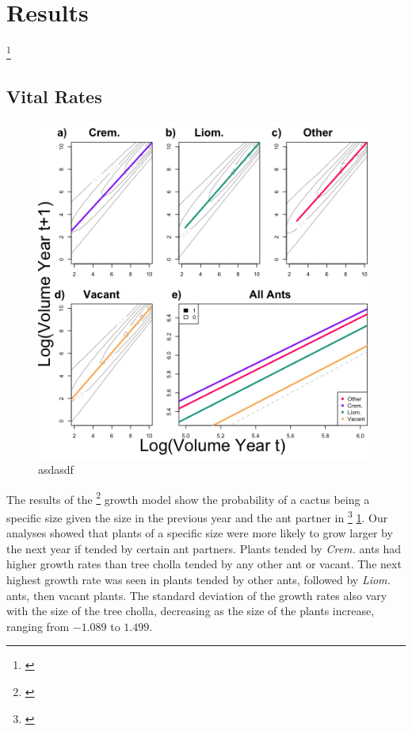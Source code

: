 \documentclass[12pt,a4paper]{article}
\newcommand{\tom}[2]{{\color{red}{#1}}\footnote{\textit{\color{red}{#2}}}}
\begin{document}
		\section*{Results}
		\tom{I’m honestly not sure what all should be included here. I feel like I need a lot more info about the specifics???}{Let's talk about this.}
		
		\subsection*{Vital Rates}
		\begin{figure}[h]
			\includegraphics[width=0.58\linewidth]{grow_contour_lines_color.png}
			\caption{asdasdf}
			\label{fig:grow}
		\end{figure}
		The results of the \tom{Bayesian}{the model is not intrinsically Bayesian} growth model show the probability of a cactus being a specific size given the size in the previous year and the ant partner in \tom{Figure}{this figure needs data} \ref{fig:grow}.
		Our analyses showed that plants of a specific size were more likely to grow larger by the next year if tended by certain ant partners. 
		Plants tended by \textit{Crem.} ants had higher growth rates than tree cholla tended by any other ant or vacant. 
		The next highest growth rate was seen in plants tended by other ants, followed by \textit{Liom.} ants, then vacant plants. 
		The standard deviation of the growth rates also vary with the size of the tree cholla, decreasing as the size of the plants increase, ranging from $-1.089$ to $1.499$.
		
\end{document}

